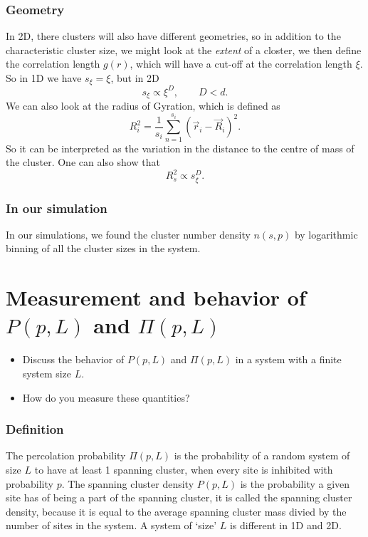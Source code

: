 \documentclass[a4paper, 11pt, notitlepage, english]{article}
\begin{document}
\subsubsection*{Geometry}

In 2D, there clusters will also have different geometries, so in addition to the characteristic cluster size, we might look at the \emph{extent} of a closter, we then define the correlation length $g(r)$, which will have a cut-off at the correlation length $\xi$. So in 1D we have $s_\xi = \xi$, but in 2D
$$s_\xi \propto \xi^{D}, \qquad D < d.$$
We can also look at the radius of Gyration, which is defined as
$$R_i^2 = \frac{1}{s_i}\sum_{n=1}^{s_i} (\vec{r}_i - \vec{R}_i)^2.$$
So it can be interpreted as the variation in the distance to the centre of mass of the cluster. One can also show that
$$R_s^2 \propto s_\xi^D.$$

\subsubsection*{In our simulation}

In our simulations, we found the cluster number density $n(s,p)$ by logarithmic binning of all the cluster sizes in the system.


\clearpage



\section{Measurement and behavior of $P(p, L)$ and $\Pi(p, L)$}
\begin{itemize}
\item Discuss the behavior of $P(p, L)$ and $\Pi(p, L)$ in a system with a finite system
size $L$.
\item How do you measure these quantities?
\end{itemize}

\subsubsection*{Definition}

The percolation probability $\Pi(p, L)$ is the probability of a random system of size $L$ to have at least 1 spanning cluster, when every site is inhibited with probability $p$. The spanning cluster density $P(p,L)$ is the probability a given site has of being a part of the spanning cluster, it is called the spanning cluster density, because it is equal to the average spanning cluster mass divied by the number of sites in the system. A system of `size' $L$ is different in 1D and 2D.
\end{document}
